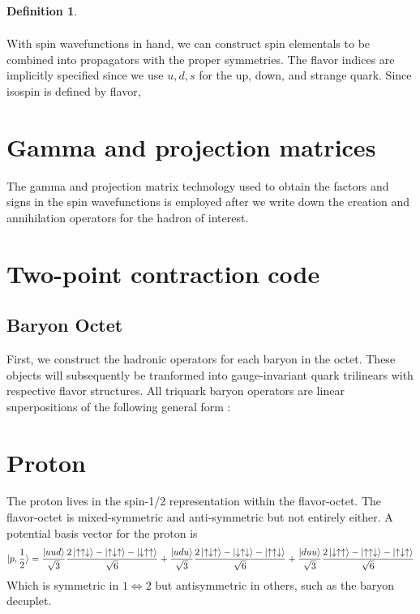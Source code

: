 \documentclass[prd,12pt,superscriptaddress,tightenlines,nofootinbib]{revtex4}
\theoremstyle{plain}
\theoremstyle{definition}
\newtheorem{defn}[thm]{Definition}
\theoremstyle{remark}
\begin{document}
\begin{defn}
\begin{gather}
\end{gather}

With spin wavefunctions in hand, we can construct spin elementals to be combined into propagators with the proper symmetries. The flavor indices 
are implicitly specified since we use $u,d,s$ for the up, down, and strange quark. Since isospin is defined by flavor, 


\section{Gamma and projection matrices}
The gamma and projection matrix technology used to obtain the factors and signs in the spin wavefunctions is employed after we write down 
the creation and annihilation operators for the hadron of interest. 

\section{Two-point contraction code}
\subsection{Baryon Octet}
First, we construct the hadronic operators for each baryon in the octet. These objects will subsequently be 
tranformed into gauge-invariant quark trilinears with respective flavor structures. All triquark baryon operators are
linear superpositions of the following general form :



\section{Proton}

The proton lives in the spin-1/2 representation within the flavor-octet. The flavor-octet is mixed-symmetric 
and anti-symmetric but not entirely either. 
A potential basis vector for the proton is 
\begin{align}
	\ket{p,\frac{1}{2}} = \frac{\ket{uud}}{\sqrt{3}} \frac{2 \ket{\uparrow\uparrow\downarrow}- \ket{\uparrow\downarrow\uparrow}- \ket{\downarrow\uparrow\uparrow}}{\sqrt{6}} +
	\frac{\ket{udu}}{\sqrt{3}} \frac{2 \ket{\uparrow\downarrow\uparrow}- \ket{\downarrow\uparrow\downarrow}- \ket{\uparrow\uparrow\downarrow}}{\sqrt{6}} +
	\frac{\ket{duu}}{\sqrt{3}} \frac{2 \ket{\downarrow\uparrow\uparrow}- \ket{\uparrow\uparrow\downarrow}- \ket{\uparrow\downarrow\uparrow}}{\sqrt{6}}
\end{align}
Which is symmetric in $1\Leftrightarrow 2$ but antisymmetric in others, such as the baryon decuplet. 



\end{defn}
\end{document}
